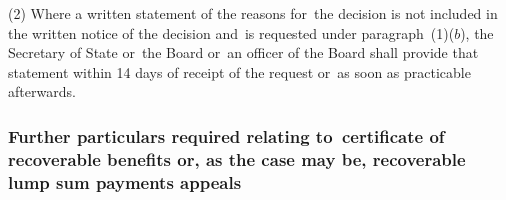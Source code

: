 \documentclass[12pt,a4paper]{article}
\begin{document}
(2) Where a written statement of the reasons for~the decision is not included in the written notice of the decision and~is requested under paragraph~(1)($b$), the Secretary of State 
or~the Board or~an officer of the Board  %
shall provide that statement within 14 days of receipt of the request
or~as soon as practicable afterwards.  %


\subsubsection[29. Further particulars required relating to~certificate of recoverable benefits 
or, as the case may be, recoverable lump sum payments  %
appeals%
]{Further particulars required relating to~certificate of recoverable benefits 
or, as the case may be, recoverable lump sum payments  %
appeals%
}
\end{document}
